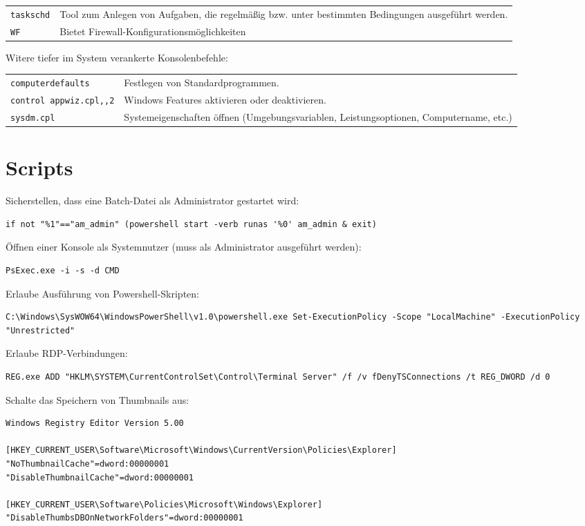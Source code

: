 \begin{multicols}{3}
\begin{tabular}{@{}p{\the\MyLen}
		@{}p{\linewidth-\the\MyLen}@{}}
	\texttt{taskschd} & Tool zum Anlegen von Aufgaben, die regelmäßig bzw. unter bestimmten Bedingungen ausgeführt werden.\\
	\texttt{WF} &  Bietet Firewall-Konfigurationsmöglichkeiten
	\end{tabular}
Witere tiefer im System verankerte Konsolenbefehle:
\begin{tabular}{@{}p{\the\MyLen}
		@{}p{\linewidth-\the\MyLen}@{}}
	\texttt{computerdefaults} & Festlegen von Standardprogrammen.\\
	\texttt{control appwiz.cpl,,2} & Windows Features aktivieren oder deaktivieren.\\
	\texttt{sysdm.cpl} & Systemeigenschaften öffnen (Umgebungsvariablen, Leistungsoptionen, Computername, etc.)
	\end{tabular}

\section{Scripts}
Sicherstellen, dass eine Batch-Datei als Administrator gestartet wird:
\begin{lstlisting}
if not "%1"=="am_admin" (powershell start -verb runas '%0' am_admin & exit)
\end{lstlisting}
Öffnen einer Konsole als Systemnutzer (muss als Administrator ausgeführt werden):
\begin{lstlisting}
PsExec.exe -i -s -d CMD
\end{lstlisting}
Erlaube Ausführung von Powershell-Skripten:
\begin{lstlisting}
C:\Windows\SysWOW64\WindowsPowerShell\v1.0\powershell.exe Set-ExecutionPolicy -Scope "LocalMachine" -ExecutionPolicy "Unrestricted"
\end{lstlisting}
Erlaube RDP-Verbindungen:
\begin{lstlisting}
REG.exe ADD "HKLM\SYSTEM\CurrentControlSet\Control\Terminal Server" /f /v fDenyTSConnections /t REG_DWORD /d 0
\end{lstlisting}
Schalte das Speichern von Thumbnails aus:
\begin{lstlisting}
Windows Registry Editor Version 5.00

[HKEY_CURRENT_USER\Software\Microsoft\Windows\CurrentVersion\Policies\Explorer]
"NoThumbnailCache"=dword:00000001
"DisableThumbnailCache"=dword:00000001

[HKEY_CURRENT_USER\Software\Policies\Microsoft\Windows\Explorer]
"DisableThumbsDBOnNetworkFolders"=dword:00000001


\end{lstlisting}
\end{multicols}
